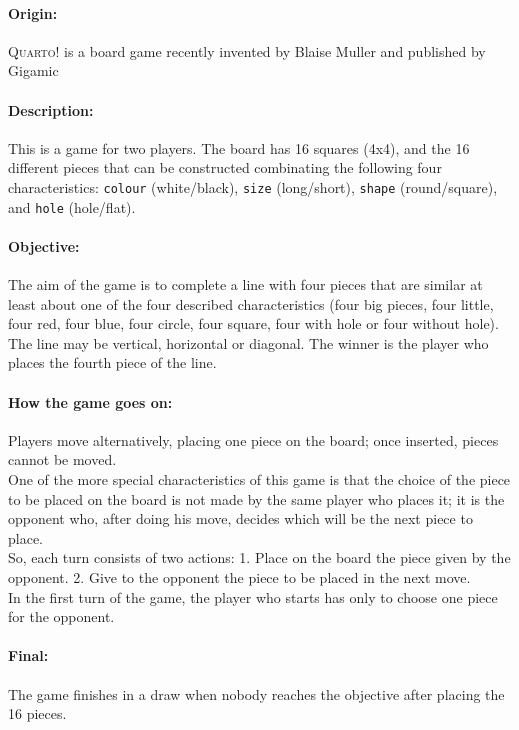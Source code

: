 \documentclass[a4paper,11pt]{article}
\newcommand{\tw}[1]{\texttt{#1}}
\begin{document}
		\paragraph{Origin:} \textsc{Quarto!} is a board game recently invented by Blaise Muller and published by Gigamic

		\paragraph{Description:} This is a game for two players. The board has 16 squares (4x4), and the 16 different pieces that can be constructed combinating the following four characteristics: \tw{colour} (white/black), \tw{size} (long/short), \tw{shape} (round/square), and \tw{hole} (hole/flat).
		
		\paragraph{Objective:} The aim of the game is to complete a line with four pieces that are similar at least about one of the four described characteristics (four big pieces, four little, four red, four blue, four circle, four square, four with hole or four without hole). The line may be vertical, horizontal or diagonal. The winner is the player who places the fourth piece of the line.

		\paragraph{How the game goes on:} Players move alternatively, placing one piece on the board; once inserted, pieces cannot be moved. \\
		One of the more special characteristics of this game is that the choice of the piece to be placed on the board is not made by the same player who places it; it is the opponent who, after doing his move, decides which will be the next piece to place. \\
		So, each turn consists of two actions: 1. Place on the board the piece given by the opponent. 2. Give to the opponent the piece to be placed in the next move. \\
		In the first turn of the game, the player who starts has only to choose one piece for the opponent.

		\paragraph{Final:} The game finishes in a draw when nobody reaches the objective after placing the 16 pieces.
\end{document}
